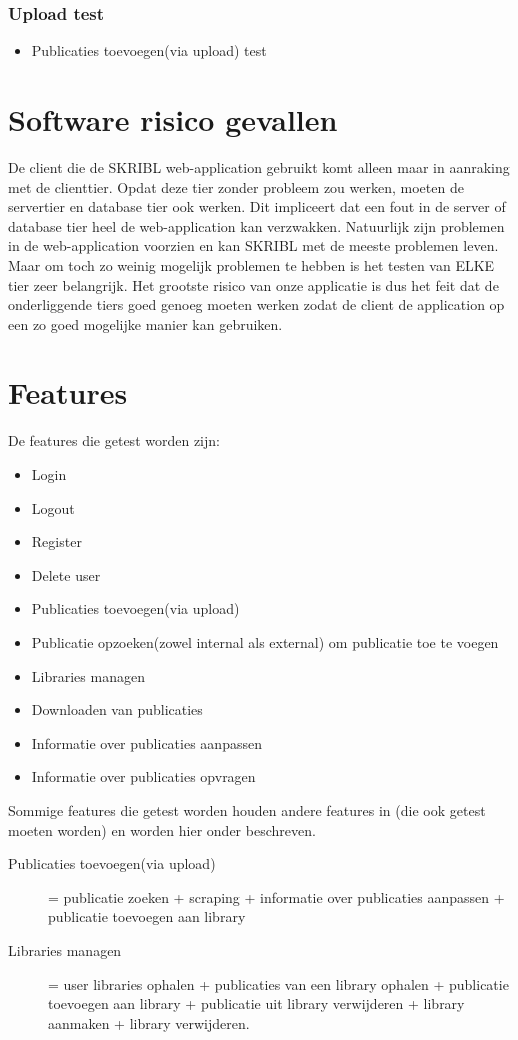 \documentclass{article}
\begin{document}
\subsubsection{Upload test}
\begin{itemize}
  \item Publicaties toevoegen(via upload) test
\end{itemize}
\section{Software risico gevallen}
De client die de SKRIBL web-application gebruikt komt alleen maar in aanraking met de clienttier. Opdat deze tier zonder probleem zou werken, moeten de servertier en database tier ook werken. Dit impliceert dat een fout in de server of database tier heel de web-application kan verzwakken. Natuurlijk zijn problemen in de web-application voorzien en kan SKRIBL met de meeste problemen leven. Maar om toch zo weinig mogelijk problemen te hebben is het testen  van ELKE tier zeer belangrijk. Het grootste risico van onze applicatie is dus het feit dat de onderliggende tiers goed genoeg moeten werken zodat de client de application op een zo goed mogelijke manier kan gebruiken.
%
\section{Features}
De features die getest worden zijn:
\begin{itemize}
  \item Login 
  \item Logout 
  \item Register
  \item Delete user
  \item Publicaties toevoegen(via upload)
  \item Publicatie opzoeken(zowel internal als external) om publicatie toe te voegen
  \item Libraries managen
  \item Downloaden van publicaties
  \item Informatie over publicaties aanpassen
  \item Informatie over publicaties opvragen
\end{itemize}
Sommige features die getest worden houden andere features in (die ook getest moeten worden) en worden hier onder beschreven.\\
\begin{description}
\item[Publicaties toevoegen(via upload)] = publicatie zoeken + scraping + informatie over publicaties aanpassen + publicatie toevoegen aan library
\item[Libraries managen] = user libraries ophalen + publicaties van een library ophalen + publicatie toevoegen aan library + publicatie uit library verwijderen + library aanmaken + library verwijderen.
\end{description}
%
\end{document}
